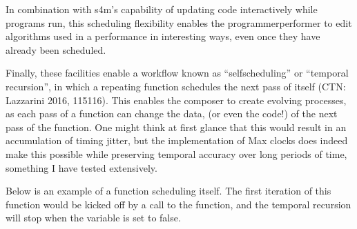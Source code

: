\documentclass[letterpaper,10pt,english]{sphinxmanual}
\begin{document}
\begin{sphinxVerbatim}[commandchars=\\\{\}]
\end{sphinxVerbatim}

\sphinxAtStartPar
In combination with s4m’s capability of updating code interactively while
programs run, this scheduling flexibility enables the programmer\sphinxhyphen{}performer
to edit algorithms used in a performance in interesting ways, even once
they have already been scheduled.

\sphinxAtStartPar
Finally, these facilities enable a workflow known as
“self\sphinxhyphen{}scheduling” or “temporal recursion”,
in which a repeating function schedules the next pass of itself (CTN: Lazzarini 2016, 115\sphinxhyphen{}116).
This enables the composer to create evolving
processes, as each pass of a function can change the data,
(or even the code!) of the next pass of the function. One might think
at first glance that this would result in an accumulation of timing
jitter, but the implementation of Max clocks does indeed make this possible
while preserving temporal accuracy over long periods of time, something
I have tested extensively.

\sphinxAtStartPar
Below is an example of a function scheduling itself. The first iteration
of this function would be kicked off by a call to the  function,
and the temporal recursion will stop when the variable  is set to false.
\end{document}
